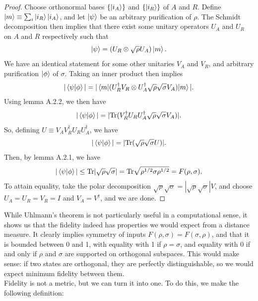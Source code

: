 \documentclass[12pt,a4paper]{report}
\numberwithin{equation}{section}
\newcommand{\tr}{\text{Tr}}
\theoremstyle{definition}
\theoremstyle{theorem}
\theoremstyle{theorem}
\theoremstyle{example}
\theoremstyle{definition}
\begin{document}
\begin{proof}
	Choose orthonormal bases $\{\ket{i_{A}}\}$ and $\{\ket{i_{R}}\}$ of $A$ and $R$. Define $\ket{m}\equiv\sum_{i}\ket{i_{R}}\ket{i_{A}}$, and let $\ket{\psi}$ be an arbitrary purification of $\rho$. The  Schmidt decomposition then implies that there exist some unitary operators $U_{A}$ and $U_{R}$ on $A$ and $R$ respectively such that
	\begin{equation}
		\ket{\psi}=(U_{R}\otimes\sqrt{\rho}U_{A})\ket{m}.
	\end{equation}
	We have an identical statement for some other unitaries $V_{A}$ and $V_{R}$, and arbitrary purification $\ket{\phi}$ of $\sigma$. Taking an inner product then implies
	\begin{equation}
		|\braket{\psi|\phi}|=|\braket{m|(U_{R}^{\dagger}V_{R}\otimes U_{A}^{\dagger}\sqrt{\rho}\sqrt{\sigma}V_{A})|m}|.
	\end{equation}
	Using lemma A.2.2, we then have
	\begin{equation}
		|\braket{\psi|\phi}|=|\tr(V_{R}^{\dagger}U_{R}U_{A}^{\dagger}\sqrt{\rho}\sqrt{\sigma}V_{A})|.
	\end{equation}
	So, defining $U\equiv V_{A}V_{R}^{\dagger}U_{R}U_{A}^{\dagger}$, we have
	\begin{equation}
		|\braket{\psi|\phi}|=|\tr(\sqrt{\rho}\sqrt{\sigma}U)|.
	\end{equation}
	Then, by lemma A.2.1, we have
	\begin{equation}
		|\braket{\psi|\phi}|\leq\tr|\sqrt{\rho}\sqrt{\sigma}|=\tr\sqrt{\rho^{1/2}\sigma\rho^{1/2}}=F(\rho,\sigma).
	\end{equation}
	To attain equality, take the polar decomposition $\sqrt{\rho}\sqrt{\sigma}=|\sqrt{\rho}\sqrt{\sigma}|V$, and choose $U_{A}=U_{R}=V_{R}=I$ and $V_{A}=V^{\dagger}$, and we are done.
\end{proof}
While Uhlmann's theorem is not particularly useful in a computational sense, it shows us that the fidelity indeed has properties we would expect from a distance measure. It clearly implies symmetry of inputs $F(\rho,\sigma)=F(\sigma,\rho)$, and that it is bounded between 0 and 1, with equality with 1 if $\rho=\sigma$, and equality with 0 if and only if $\rho$ and $\sigma$ are supported on orthogonal subspaces. This would make sense: if two states are orthogonal, they are perfectly distinguishable, so we would expect minimum fidelity between them.\\
Fidelity is not a metric, but we can turn it into one. To do this, we make the following definition:
\end{document}
